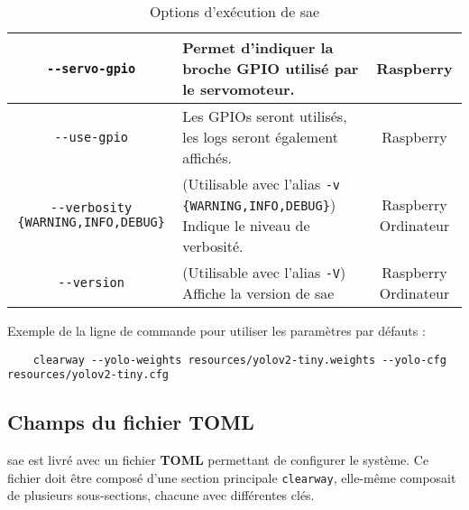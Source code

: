 \begin{table}[H]
\begin{tabularx}{\linewidth}{|c|X|c|}
        \texttt{-{}-servo-gpio}                       & Permet d'indiquer la broche GPIO utilisé par le servomoteur.                                                                                               & Raspberry            \\\hline
        \texttt{-{}-use-gpio}                         & Les GPIOs seront utilisés, les logs seront également affichés.                                                                                             & Raspberry            \\\hline
        \texttt{-{}-verbosity \{WARNING,INFO,DEBUG\}} & (Utilisable avec l'alias \texttt{-v \{WARNING,INFO,DEBUG\}}) Indique le niveau de verbosité.                                                               & Raspberry Ordinateur \\\hline
        \texttt{-{}-version}                          & (Utilisable avec l'alias \texttt{-V}) Affiche la version de \gls{sae}                                                                                      & Raspberry Ordinateur \\\hline
    \end{tabularx}
    \label{tabOptClearway}
    \caption{Options d'exécution de \gls{sae}}
\end{table}

Exemple de la ligne de commande pour utiliser les paramètres par défauts :

\begin{verbatim}
    clearway --yolo-weights resources/yolov2-tiny.weights --yolo-cfg  resources/yolov2-tiny.cfg
\end{verbatim}

\subsection{Champs du fichier \textbf{TOML}}
\label{sec:executionTOML_clearWay}

\gls{sae} est livré avec un fichier \textbf{TOML} permettant de configurer le système. Ce fichier doit être composé
d'une section principale \texttt{clearway}, elle-même composait de plusieurs sous-sections, chacune avec différentes clés.

